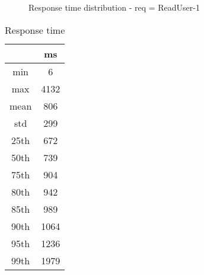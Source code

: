 \begin{minipage}{0.75\linewidth}
\begin{figure}[h]
\begin{adjustbox}{max width=1.0\linewidth, keepaspectratio}
  \end{adjustbox}
  \caption{Response time distribution - req = ReadUser-1}
\end{figure}
\end{minipage}\hfill\begin{minipage}{0.18\linewidth}
\begin{table}[h]
\begin{tabular}{|cc|}
\hline
\textbf{} & \textbf{ms}\\ \hline
 \Xhline{0.005\arrayrulewidth}
min & 6\\
 \Xhline{0.005\arrayrulewidth}
max & 4132\\
 \Xhline{0.005\arrayrulewidth}
mean & 806\\
 \Xhline{0.005\arrayrulewidth}
std & 299\\
\hline
\hline
 \Xhline{0.005\arrayrulewidth}
25th & 672\\
 \Xhline{0.005\arrayrulewidth}
50th & 739\\
 \Xhline{0.005\arrayrulewidth}
75th & 904\\
 \Xhline{0.005\arrayrulewidth}
80th & 942\\
 \Xhline{0.005\arrayrulewidth}
85th & 989\\
 \Xhline{0.005\arrayrulewidth}
90th & 1064\\
 \Xhline{0.005\arrayrulewidth}
95th & 1236\\
 \Xhline{0.005\arrayrulewidth}
99th & 1979\\
\hline
\end{tabular}
\caption{Response time}
\end{table}
\end{minipage}\hfill
